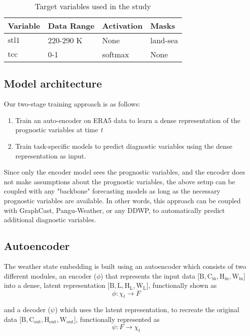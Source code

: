 \documentclass{article}
\begin{document}
\begin{table}[ht]
  \caption{Target variables used in the study }
  \label{outvar-table}
  \centering
  \begin{tabular}{llll}
    \toprule
    Variable & Data Range &Activation & Masks  \\
    \midrule
    $\mathrm{stl1}$  & 220-290 K &  None & land-sea \\
    \midrule
    $\mathrm{tcc}$  & 0-1 &  softmax & None \\
    \bottomrule
  \end{tabular}
\end{table}

\subsection{Model architecture}
Our two-stage training approach is as follows:
\begin{enumerate}
    \item Train an auto-encoder on ERA5 data to learn a dense representation of the prognostic variables at time \textit{t}
    \item Train task-specific models to predict diagnostic variables using the dense representation as input.
\end{enumerate}
Since only the encoder model sees the prognostic variables, and the encoder does not make assumptions about the prognostic variables, the above setup can be coupled with any "backbone" forecasting models as long as the necessary prognostic variables are available. In other words, this approach can be coupled with GraphCast, Pangu-Weather, or any DDWP, to automatically predict additional diagnostic variables.

\subsection{Autoencoder}

The weather state embedding is built using an autoencoder which consists of two different modules, an encoder ($\phi$) that represents the input data [$\mathrm{B, C_{in}, H_{in}, W_{in}}$] into a dense, latent representation [$\mathrm{B, L, H_{L}, W_{L}}$], functionally shown as
\begin{equation}
    \phi : \chi_{t} \xrightarrow{}  F 
\end{equation}

and a decoder ($\psi$) which uses the latent representation, to recreate the original data [$\mathrm{B, C_{out}, H_{out}, W_{out}}$], functionally represented as
\begin{equation}
    \psi: F \xrightarrow{} \chi_{t}
\end{equation}
\end{document}
